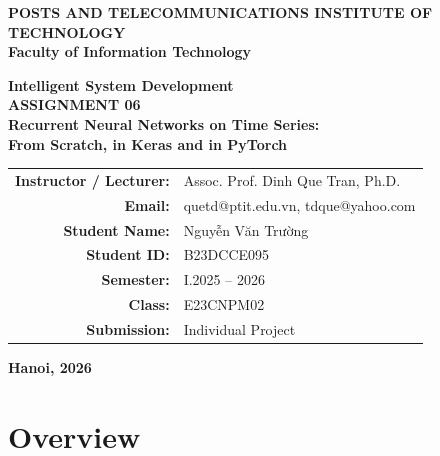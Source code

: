 \documentclass[11pt, a4paper]{article}
\begin{document}
\begin{titlepage}
\begin{center}

\vspace*{0.5cm}

\Large
\textbf{POSTS AND TELECOMMUNICATIONS INSTITUTE OF TECHNOLOGY}\\
\textbf{Faculty of Information Technology}

\vspace{2.0cm}

\Huge
\textbf{Intelligent System Development}\\
\vspace{0.4cm}
\LARGE
\textbf{ASSIGNMENT 06}\\
\vspace{0.6cm}
\Large
\textbf{Recurrent Neural Networks on Time Series:\\From Scratch, in Keras and in PyTorch}

\vspace{1.2cm}

\vfill

\normalsize
\begin{tabular}{rl}
\textbf{Instructor / Lecturer:} & Assoc. Prof. Dinh Que Tran, Ph.D. \\
\textbf{Email:} & quetd@ptit.edu.vn, tdque@yahoo.com \\[0.8cm]
\textbf{Student Name:} & Nguyễn Văn Trường \\
\textbf{Student ID:} & B23DCCE095 \\
\textbf{Semester:} & I.2025 -- 2026 \\
\textbf{Class:} & E23CNPM02 \\
\textbf{Submission:} & Individual Project \\
\end{tabular}

\vfill

\textbf{Hanoi, 2026}

\vspace{0.5cm}

\end{center}
\end{titlepage}

\tableofcontents
\newpage

\section{Overview}
\end{document}
